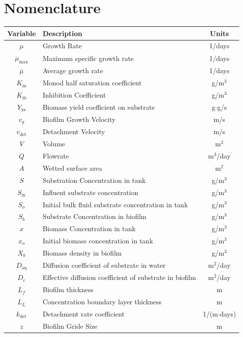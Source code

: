 \documentclass[letterpaper, twoside]{article}
\numberwithin{equation}{section}
\begin{document}
\section{Nomenclature}
\begin{tabular}{c l c}
  Variable & Description & Units\\ \hline
  $\mu$ & Growth Rate & 1/days\\
  $\mu_\mathrm{max}$  & Maximum specific growth rate & 1/days\\
  $\bar\mu$ & Average growth rate & 1/days\\
  $K_\mathrm{m}$ & Monod half saturation coefficient & g/m$^3$\\
  $K_\mathrm{ib}$ & Inhibition Coefficient & g/m$^3$\\
  $Y_\mathrm{xs}$ & Biomass yield coefficient on substrate & g$\cdot$g/s\\
  $v_g$ & Biofilm Growth Velocity & m/s\\
  $v_\mathrm{det}$ & Detachment Velocity & m/s\\
  $V$ & Volume &m$^3$ \\
  $Q$	& Flowrate & m$^3$/day\\
  $A$	& Wetted surface area & m$^2$\\
  $S$ & Substration Concentration in tank & g/m$^3$\\
  $S_{\mathrm{in}}$ & Influent substrate concentration &  g/m$^3$ \\
  $S_o$ & Initial bulk fluid substrate concentration in tank &  g/m$^3$ \\
  $S_b$ & Substrate Concentration in biofilm & g/m$^3$ \\
  $x$ & Biomass Concentration in tank & g/m$^3$\\
  $x_o$ & Initial biomass concentration in tank &  g/m$^3$ \\
  $X_b$ & Biomass density in biofilm &  g/m$^3$ \\
  $D_\mathrm{aq}$ & Diffusion coefficient of substrate in water & m$^2$/day \\
  $D_e$ & Effective diffusion coefficient of substrate in biofilm & m$^2$/day \\
  $L_{f}$ & Biofilm thickness & m\\
  $L_L$ & Concentration boundary layer thickness & m \\
  $k_\mathrm{det}$ &	Detachment rate coefficient & 1/(m$\cdot$days)\\
  $z$ & Biofilm Gride Size & m
\end{tabular}
\end{document}
